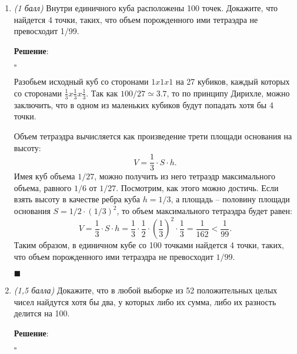 \documentclass{article}
\begin{document}
\begin{enumerate}
        

        \item \textit{(1 балл)} Внутри единичного куба расположены 100 точек. Докажите, что найдется
        4 точки, таких, что объем порожденного ими тетраэдра не превосходит 1/99.

        \textbf{Решение}:

        $\square$

        Разобьем исходный куб со сторонами $1 x 1 x 1$ на 27 кубиков, каждый которых со сторонами $\frac{1}{3} x \frac{1}{3} x \frac{1}{3}$. Так как $100 / 27 \simeq 3.7$, то по принципу Дирихле, можно заключить, что в одном из маленьких кубиков будут попадать хотя бы 4 точки.

        Объем тетраэдра вычисляется как произведение трети площади основания на высоту:
        \begin{equation}
            V = \frac{1}{3}\cdot S\cdot h.
        \end{equation}
        Имея куб объема $1/27$, можно получить из него тетраэдр максимального объема, равного $1/6$ от $1/27$. Посмотрим, как этого можно достичь. Если взять высоту в качестве ребра куба $h=1/3$, а площадь -- половину площади основания $S=1/2\cdot(1/3)^2$, то объем максимального тетраэдра будет равен:
        \begin{equation}
            V = \frac{1}{3}\cdot S\cdot h = \frac{1}{3}\cdot \frac{1}{2}\cdot\left(\frac{1}{3}\right)^2\cdot \frac{1}{3} = \frac{1}{162} < \frac{1}{99}.
        \end{equation}
        Таким образом, в единичном кубе со 100 точками найдется 4 точки, таких, что объем порожденного ими тетраэдра не превосходит $1/99$.

        \begin{flushright}
            $\blacksquare$
        \end{flushright}

        \item \textit{(1,5 балла)} Докажите, что в любой выборке из 52 положительных целых чисел найдутся хотя бы два, у которых либо их сумма, либо их разность делится на 100.
        
        \textbf{Решение}:

        $\square$


\end{enumerate}
\end{document}

